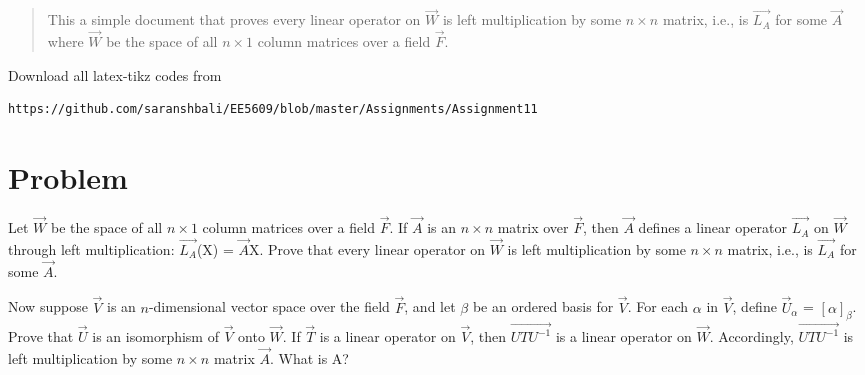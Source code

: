 \documentclass[journal,12pt,twocolumn]{IEEEtran}
\begin{document}
%
\begin{abstract}
This a simple document that proves every linear operator on $\vec{W}$ is left multiplication by some $n\times n$ matrix, i.e., is $\vec{L_{A}}$ for some $\vec{A}$ where $\vec{W}$ be the space of all $n \times 1$ column matrices over a field $\vec{F}$.
\end{abstract}
%
%
Download all latex-tikz codes from 
%
\begin{lstlisting}
https://github.com/saranshbali/EE5609/blob/master/Assignments/Assignment11
\end{lstlisting}
%
\section{Problem}
Let $\vec{W}$ be the space of all $n \times 1$ column matrices over a field $\vec{F}$. If $\vec{A}$ is an $n \times n$ matrix over $\vec{F}$, then $\vec{A}$ defines a linear operator $\vec{L_{A}}$ on $\vec{W}$ through left multiplication: $\vec{L_{A}}$(X) = $\vec{A}$X. Prove that every linear operator on $\vec{W}$ is left multiplication by some $n\times n$ matrix, i.e., is $\vec{L_{A}}$ for some $\vec{A}$.

Now suppose $\vec{V}$ is an $n$-dimensional vector space over the field $\vec{F}$, and let $\beta$ be an ordered basis for $\vec{V}$. For each $\alpha$ in $\vec{V}$, define $\vec{U}_{\alpha}$ = $[\alpha]_{\beta}$. Prove that $\vec{U}$ is an isomorphism of $\vec{V}$ onto $\vec{W}$. If $\vec{T}$ is a linear operator on $\vec{V}$, then $\vec{UTU^{-1}}$ is a linear operator on $\vec{W}$. Accordingly, $\vec{UTU^{-1}}$ is left multiplication by some $n \times n$ matrix $\vec{A}$.
What is A?
\end{document}
